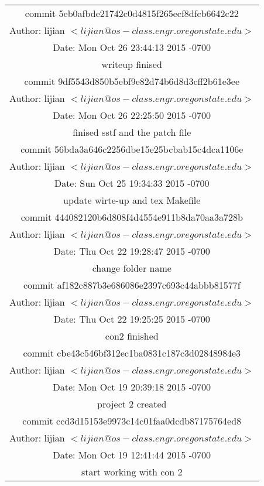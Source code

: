 \documentclass[letterpaper,11pt,titlepage]{article}
\begin{document}
\begin{table}[!hbp]
\begin{tabular}{|c|}

\hline
commit 5eb0afbde21742c0d4815f265ecf8dfcb6642c22\\
Author: lijian $<lijian@os-class.engr.oregonstate.edu>$\\
Date:   Mon Oct 26 23:44:13 2015 -0700\\
writeup finised\\

\hline
commit 9df5543d850b5ebf9e82d74b6d8d3cff2b61e3ee\\
Author: lijian $<lijian@os-class.engr.oregonstate.edu>$\\
Date:   Mon Oct 26 22:25:50 2015 -0700\\
finised sstf and the patch file\\

\hline
commit 56bda3a646c2256dbe15e25bcbab15c4dca1106e\\
Author: lijian $<lijian@os-class.engr.oregonstate.edu>$\\
Date:   Sun Oct 25 19:34:33 2015 -0700\\
update wirte-up and tex Makefile\\

\hline
commit 444082120b6d808f4d4554e911b8da70aa3a728b\\
Author: lijian $<lijian@os-class.engr.oregonstate.edu>$\\
Date:   Thu Oct 22 19:28:47 2015 -0700\\
change folder name\\

\hline
commit af182c887b3e686086e2397c693c44abbb81577f\\
Author: lijian $<lijian@os-class.engr.oregonstate.edu>$\\
Date:   Thu Oct 22 19:25:25 2015 -0700\\
con2 finished\\


\hline
commit cbe43c546bf312ec1ba0831c187c3d02848984e3\\
Author: lijian $<lijian@os-class.engr.oregonstate.edu>$\\
Date:   Mon Oct 19 20:39:18 2015 -0700\\
project 2 created\\


\hline
commit ccd3d15153e9973c14c01faa0dcdb87175764ed8\\
Author: lijian $<lijian@os-class.engr.oregonstate.edu>$\\
Date:   Mon Oct 19 12:41:44 2015 -0700\\
start working with con 2\\

\hline

 
\end{tabular}
\end{table}
\end{document}
